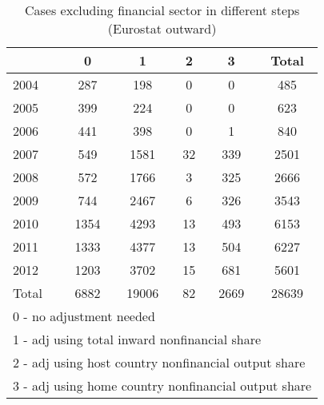 \begin{table}[htbp]\centering
\caption{Cases excluding financial sector in different steps (Eurostat outward)}
\begin{tabular}{l*{5}{c}}
\toprule
            &           0&           1&           2&           3&       Total\\
\midrule
2004        &         287&         198&           0&           0&         485\\
2005        &         399&         224&           0&           0&         623\\
2006        &         441&         398&           0&           1&         840\\
2007        &         549&        1581&          32&         339&        2501\\
2008        &         572&        1766&           3&         325&        2666\\
2009        &         744&        2467&           6&         326&        3543\\
2010        &        1354&        4293&          13&         493&        6153\\
2011        &        1333&        4377&          13&         504&        6227\\
2012        &        1203&        3702&          15&         681&        5601\\
Total       &        6882&       19006&          82&        2669&       28639\\
\bottomrule
\multicolumn{6}{l}{\footnotesize 0 - no adjustment needed}\\
\multicolumn{6}{l}{\footnotesize 1 - adj using total inward nonfinancial share}\\
\multicolumn{6}{l}{\footnotesize 2 - adj using host country nonfinancial output share}\\
\multicolumn{6}{l}{\footnotesize 3 - adj using home country nonfinancial output share}\\
\end{tabular}
\end{table}
